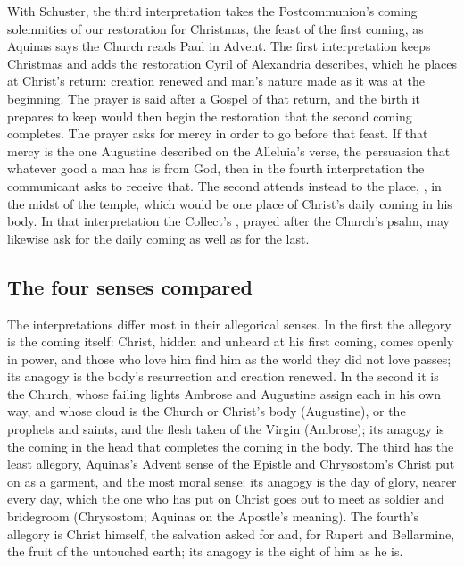 With Schuster, the third interpretation takes the Postcommunion's coming
solemnities of our restoration for Christmas, the feast of the first coming,
as Aquinas says the Church reads Paul in Advent. The first interpretation
keeps Christmas and adds the restoration Cyril of Alexandria describes, which
he places at Christ's return: creation renewed and man's nature made as it
was at the beginning. The prayer is said after a Gospel of that return, and
the birth it prepares to keep would then begin the restoration that the
second coming completes. The prayer asks for mercy in order to go before
that feast. If that mercy is the one Augustine described on the Alleluia's
verse, the persuasion that whatever good a man has is from God, then in the
fourth interpretation the communicant asks to receive that. The second
attends instead to the place, , in the midst of
the temple, which would be one place of Christ's daily coming in his body. In that interpretation the Collect's ,
prayed after the Church's psalm, may likewise ask for the daily coming as
well as for the last.

\subsection{The four senses compared}

The interpretations differ most in their allegorical senses. In the first the
allegory is the coming itself: Christ, hidden and unheard at his first coming,
comes openly in power, and those who love him find him as the world they did
not love passes; its anagogy is the body's resurrection and creation renewed.
In the second it is the Church, whose failing lights Ambrose and Augustine
assign each in his own way, and whose cloud is the Church or Christ's body
(Augustine), or the prophets and saints, and the flesh taken of the Virgin
(Ambrose); its anagogy is the coming in the head that completes the coming in
the body. The third has the least allegory, Aquinas's Advent sense of the
Epistle and Chrysostom's Christ put on as a garment, and the most moral
sense; its anagogy is the day of glory, nearer every day, which the one who
has put on Christ goes out to meet as soldier and bridegroom (Chrysostom;
Aquinas on the Apostle's meaning). The fourth's allegory is Christ himself, the salvation asked for and, for Rupert
and Bellarmine, the fruit of the untouched earth; its anagogy is the sight of
him as he is.

